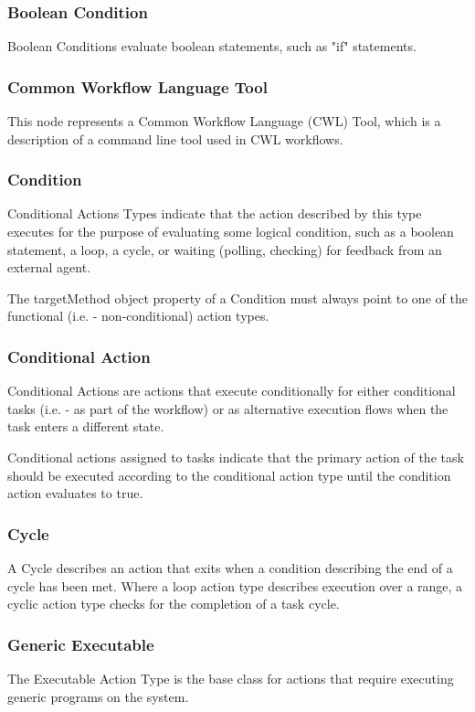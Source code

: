 			\subsubsection{
			Boolean Condition
			}
			Boolean Conditions evaluate boolean statements, such as "if" statements.
			\subsubsection{
			Common Workflow Language Tool
			}
			This node represents a Common Workflow Language (CWL) Tool, which is a description of a command line tool used in CWL workflows.
			\subsubsection{
			Condition
			}
			Conditional Actions Types indicate that the action described by this type executes for the purpose of evaluating some logical condition, such as a boolean statement, a loop, a cycle, or waiting (polling, checking) for feedback from an external agent.
			
			The targetMethod object property of a Condition must always point to one of the functional (i.e. - non-conditional) action types.
			\subsubsection{
			Conditional Action
			}
			Conditional Actions are actions that execute conditionally for either conditional tasks (i.e. - as part of the workflow) or as alternative execution flows when the task enters a different state.

Conditional actions assigned to tasks indicate that the primary action of the task should be executed according to the conditional action type until the condition action evaluates to true.
			\subsubsection{
			Cycle
			}
			A Cycle describes an action that exits when a condition describing the end of a cycle has been met. Where a loop action type describes execution over a range, a cyclic action type checks for the completion of a task cycle.
			\subsubsection{
			Generic Executable
			}
			The Executable Action Type is the base class for actions that require executing generic programs on the system.
